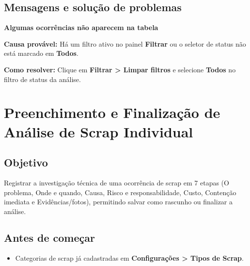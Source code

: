 \subsection*{Mensagens e solução de problemas}

\begin{remark}
\textbf{Algumas ocorrências não aparecem na tabela}\par
\textbf{Causa provável:} Há um filtro ativo no painel \textbf{Filtrar} ou o seletor de status não está marcado em \textbf{Todos}.\par
\textbf{Como resolver:} Clique em \textbf{Filtrar > Limpar filtros} e selecione \textbf{Todos} no filtro de status da análise.
\end{remark}

\section{Preenchimento e Finalização de Análise de Scrap Individual}

\subsection*{Objetivo}

Registrar a investigação técnica de uma ocorrência de scrap em 7 etapas (O problema, Onde e quando, Causa, Risco e responsabilidade, Custo, Contenção imediata e Evidências/fotos), permitindo salvar como rascunho ou finalizar a análise.\par

\subsection*{Antes de começar}

\begin{itemize}
\item Categorias de scrap já cadastradas em \textbf{Configurações > Tipos de Scrap}.
\end{itemize}


